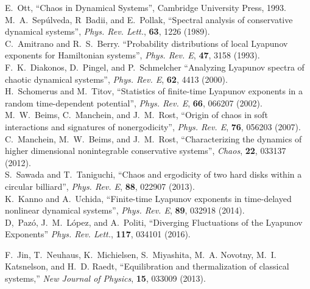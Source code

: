 \documentclass[a4paper, onecolumn]{revtex4-1}
\begin{document}
\begin{thebibliography}{1}
E.~Ott, ``Chaos in Dynamical Systems'', Cambridge University Press,  1993.
%
\\ 
%
M.~A.~Sep\'ulveda, R~Badii, and E.~Pollak, 
``Spectral analysis of conservative dynamical systems'', 
{\em Phys. Rev. Lett.}, {\bf 63}, 1226 (1989). 
%
\\ 
%
C.~Amitrano and R.~S.~Berry. 
``Probability distributions of local Lyapunov exponents for Hamiltonian systems'', 
{\em Phys. Rev. E}, {\bf 47}, 3158 (1993). 
%
\\ 
%
F.~K.~Diakonos, D.~Pingel, and P.~Schmelcher
``Analyzing Lyapunov spectra of chaotic dynamical systems'', 
{\em Phys. Rev. E}, {\bf 62}, 4413 (2000).
%
\\ 
%
H.~Schomerus and M.~Titov, 
``Statistics of finite-time Lyapunov exponents in a random time-dependent potential'', 
{\em Phys. Rev. E}, {\bf 66}, 066207 (2002). 
%
\\ 
%
M.~W.~Beims, C.~Manchein, and J.~M.~Rost, 
``Origin of chaos in soft interactions and signatures of nonergodicity'', 
{\em Phys. Rev. E}, {\bf 76}, 056203 (2007).
%
\\ 
%
C.~Manchein, M.~W.~Beims, and J.~M.~Rost, ``Characterizing the dynamics of higher dimensional
nonintegrable conservative systems'', {\em Chaos}, {\bf 22}, 033137 (2012).
%
\\ 
%
S.~Sawada and T.~Taniguchi, 
``Chaos and ergodicity of two hard disks within a circular billiard'', 
{\em Phys. Rev. E}, {\bf 88}, 022907 (2013). 
%
\\ 
%
K.~Kanno and A.~Uchida, ``Finite-time Lyapunov exponents in time-delayed nonlinear dynamical
systems'',  {\em Phys. Rev. E}, {\bf 89}, 032918 (2014). 
%
\\ 
%
D,~Paz\'o, J.~M.~L\'opez, and A.~Politi, 
``Diverging Fluctuations of the Lyapunov Exponents'' 
{\em Phys. Rev. Lett.},  {\bf 117}, 034101 (2016). 




F.~Jin, T.~Neuhaus, K.~Michielsen, S.~Miyashita, M.~A. Novotny, M.~I.
  Katsnelson, and H.~D. Raedt, ``Equilibration and thermalization of classical
  systems,'' {\em New Journal of Physics}, {\bf 15}, 033009 (2013).




\end{thebibliography}
\end{document}
